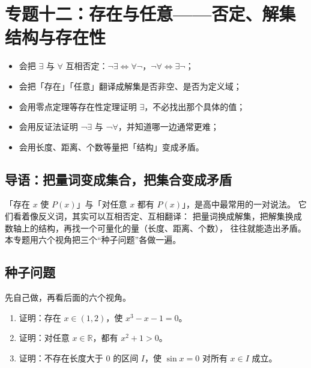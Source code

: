 \section{专题十二：存在与任意——否定、解集结构与存在性}

\begin{learnobjective}
\begin{itemize}
  \item 会把 $\exists$ 与 $\forall$ 互相否定：$\neg\exists\iff\forall\neg$，$\neg\forall\iff\exists\neg$；
  \item 会把「存在」「任意」翻译成解集是否非空、是否为定义域；
  \item 会用零点定理等存在性定理证明 $\exists$，不必找出那个具体的值；
  \item 会用反证法证明 ¬$\exists$ 与 ¬$\forall$，并知道哪一边通常更难；
  \item 会用长度、距离、个数等量把「结构」变成矛盾。
\end{itemize}
\end{learnobjective}

\begin{preview}
\subsection{导语：把量词变成集合，把集合变成矛盾}
「存在 $x$ 使 $P(x)$」与「对任意 $x$ 都有 $P(x)$」，是高中最常用的一对说法。
它们看着像反义词，其实可以互相否定、互相翻译：
把量词换成解集，把解集换成数轴上的结构，再找一个可量化的量（长度、距离、个数），
往往就能造出矛盾。
本专题用六个视角把三个“种子问题”各做一遍。

\subsection{种子问题}
先自己做，再看后面的六个视角。
\begin{enumerate}
  \item 证明：存在 $x\in(1,2)$，使 $x^3-x-1=0$。
  \item 证明：对任意 $x\in\mathbb{R}$，都有 $x^2+1>0$。
  \item 证明：不存在长度大于 $0$ 的区间 $I$，使 $\sin x=0$ 对所有 $x\in I$ 成立。
\end{enumerate}
\end{preview}

